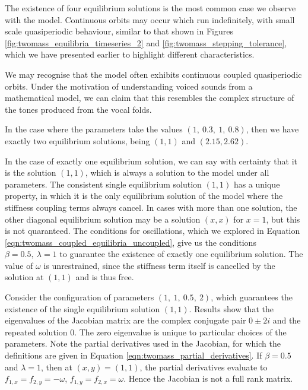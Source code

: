 \documentclass{article}
\begin{document}
The existence of four equilibrium solutions is the most common case we observe with the model.
Continuous orbits may occur which run indefinitely, with small scale quasiperiodic behaviour,
similar to that shown in Figures \ref{fig:twomass_equilibria_timeseries_2} and \ref{fig:twomass_stepping_tolerance},
which we have presented earlier to highlight different characteristics.

We may recognise that the model often exhibits continuous coupled quasiperiodic orbits.
Under the motivation of understanding voiced sounds from a mathematical model,
we can claim that this resembles the complex structure of the tones produced from the vocal folds.


In the case where the parameters take the values \((1,~0.3,~1,~0.8)\),
then we have exactly two equilibrium solutions,
being \((1,1)\) and \((2.15,2.62)\).



In the case of exactly one equilibrium solution,
we can say with certainty that it is the solution \((1,1)\),
which is always a solution to the model under all parameters.
The consistent single equilibrium solution \((1,1)\) has a unique property,
in which it is the only equilibrium solution of the model where the stiffness coupling terms always cancel.
In cases with more than one solution, the other diagonal equilibrium solution may be a solution \((x,x)\) for $x=1$,
but this is not quaranteed.
The conditions for oscillations,
which we explored in Equation \ref{eqn:twomass_coupled_equilibria_uncoupled},
give us the conditions \(\beta=0.5,~\lambda=1\) to guarantee the existence of exactly one equilibrium solution.
The value of $\omega$ is unrestrained, since the stiffness term itself is cancelled by the solution at \((1,1)\) and is thus free.

Consider the configuration of parameters \((1,~1,~0.5,~2)\),
which guarantees the existence of the single equilibrium solution \((1,1)\).
Results show that the eigenvalues of the Jacobian matrix are the complex conjugate pair $ 0 \pm 2i$ and the repeated solution $0$.
The zero eigenvalue is unique to particular choices of the parameters.
Note the partial derivatives used in the Jacobian, for which the definitions are given in Equation \ref{eqn:twomass_partial_derivatives}.
If $\beta = 0.5$ and $\lambda = 1$, then at \((x,y) = (1,1)\),
the partial derivatives evaluate to \(f_{1,x} = f_{2,y} = -\omega\), \(f_{1,y} = f_{2,x} = \omega\).
Hence the Jacobian is not a full rank matrix.
\end{document}
